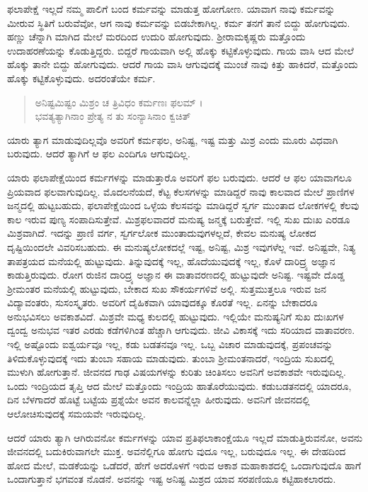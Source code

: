 ಫಲಾಪೇಕ್ಷೆ ಇಲ್ಲದೆ ನಮ್ಮ ಪಾಲಿಗೆ ಬಂದ ಕರ್ಮವನ್ನು ಮಾಡುತ್ತ ಹೋಗೋಣ. ಯಾವಾಗ ನಾವು ಕರ್ಮವನ್ನು ಮೀರುವ ಸ್ಥಿತಿಗೆ ಬರುವೆವೋ, ಆಗ ನಾವು ಕರ್ಮವನ್ನು ಬಿಡಬೇಕಾಗಿಲ್ಲ. ಕರ್ಮ ತನಗೆ ತಾನೆ ಬಿದ್ದು ಹೋಗುವುದು. ಹಣ್ಣು ಚೆನ್ನಾಗಿ ಮಾಗಿದ ಮೇಲೆ ಮರದಿಂದ ಉದುರಿ ಹೋಗುವುದು. ಶ್ರೀರಾಮಕೃಷ್ಣರು ಮತ್ತೊಂದು ಉದಾಹರಣೆಯನ್ನು ಕೊಡುತ್ತಿದ್ದರು. ಬಿದ್ದರೆ ಗಾಯವಾಗಿ ಅಲ್ಲಿ ಹೊಕ್ಕು ಕಟ್ಟಿಕೊಳ್ಳುವುದು. ಗಾಯ ವಾಸಿ ಆದ ಮೇಲೆ ಹೊಕ್ಕು ತಾನೇ ಬಿದ್ದು ಹೋಗುವುದು. ಆದರೆ ಗಾಯ ವಾಸಿ ಆಗುವುದಕ್ಕೆ ಮುಂಚೆ ನಾವು ಕಿತ್ತು ಹಾಕಿದರೆ, ಮತ್ತೊಂದು ಹೊಕ್ಕು ಕಟ್ಟಿಕೊಳ್ಳುವುದು. ಅದರಂತೆಯೇ ಕರ್ಮ.

\begin{verse}
ಅನಿಷ್ಟಮಿಷ್ಟಂ ಮಿಶ್ರಂ ಚ ತ್ರಿವಿಧಂ ಕರ್ಮಣಃ ಫಲಮ್ ।\\ಭವತ್ಯತ್ಯಾಗಿನಾಂ ಪ್ರೇತ್ಯ ನ ತು ಸಂನ್ಯಾಸಿನಾಂ ಕ್ವಚಿತ್ 
\end{verse}

{\small ಯಾರು ತ್ಯಾಗ ಮಾಡುವುದಿಲ್ಲವೊ ಅವರಿಗೆ ಕರ್ಮಫಲ, ಅನಿಷ್ಟ, ಇಷ್ಟ ಮತ್ತು ಮಿಶ್ರ ಎಂದು ಮೂರು ವಿಧವಾಗಿ ಬರುವುದು. ಆದರೆ ತ್ಯಾಗಿಗೆ ಆ ಫಲ ಎಂದಿಗೂ ಆಗುವುದಿಲ್ಲ.}

ಯಾರು ಫಲಾಪೇಕ್ಷೆಯಿಂದ ಕರ್ಮಗಳನ್ನು ಮಾಡುತ್ತಾರೊ ಅವರಿಗೆ ಫಲ ಬರುವುದು. ಆದರೆ ಆ ಫಲ ಯಾವಾಗಲೂ ಪ್ರಿಯವಾದ ಫಲವಾಗುವುದಿಲ್ಲ. ಮೊದಲನೆಯದೆ, ಕೆಟ್ಟ ಕೆಲಸಗಳನ್ನು ಮಾಡಿದ್ದರೆ ನಾವು ಕಾಲವಾದ ಮೇಲೆ ಪ್ರಾಣಿಗಳ ಜನ್ಮದಲ್ಲಿ ಹುಟ್ಟಬಹುದು, ಫಲಾಪೇಕ್ಷೆಯಿಂದ ಒಳ್ಳೆಯ ಕೆಲಸವನ್ನು ಮಾಡಿದ್ದರೆ ಸ್ವರ್ಗ ಮುಂತಾದ ಲೋಕಗಳಲ್ಲಿ ಕೆಲವು ಕಾಲ ಇರುವ ಪುಣ್ಯ ಸಂಪಾದಿಸುತ್ತೇವೆ. ಮಿಶ್ರಫಲವಾದರೆ ಮನುಷ್ಯ ಜನ್ಮಕ್ಕೆ ಬರುತ್ತೇವೆ. ಇಲ್ಲಿ ಸುಖ ದುಃಖ ಎರಡೂ ಮಿಶ್ರವಾಗಿದೆ. ಇದನ್ನು ಪ್ರಾಣಿ ವರ್ಗ, ಸ್ವರ್ಗಲೋಕ ಮುಂತಾದುವುಗಳಲ್ಲದೆ, ಕೇವಲ ಮನುಷ್ಯ ಲೋಕದ ದೃಷ್ಟಿಯಿಂದಲೇ ವಿವರಿಸಬಹುದು. ಈ ಮನುಷ್ಯಲೋಕದಲ್ಲೆ ಇಷ್ಟ, ಅನಿಷ್ಟ, ಮಿಶ್ರ ಇವುಗಳೆಲ್ಲ ಇವೆ. ಅನಿಷ್ಟವೇ, ನಿತ್ಯ ತಾಪತ್ರಯದ ಮನೆಯಲ್ಲಿ ಹುಟ್ಟುವುದು. ತಿನ್ನುವುದಕ್ಕೆ ಇಲ್ಲ, ಹೊದೆಯುವುದಕ್ಕೆ ಇಲ್ಲ, ಕೊಳೆ ದಾರಿದ್ರ್ಯ ಅಜ್ಞಾನ ಕಾಡುತ್ತಿರುವುದು. ರೋಗ ರುಜಿನ ದಾರಿದ್ರ್ಯ ಅಜ್ಞಾನ ಈ ವಾತಾವರಣದಲ್ಲಿ ಹುಟ್ಟುವುದೇ ಅನಿಷ್ಟ. ಇಷ್ಟವೇ ದೊಡ್ಡ ಶ್ರೀಮಂತರ ಮನೆಯಲ್ಲಿ ಹುಟ್ಟುವುದು, ಬೇಕಾದ ಸುಖ ಸೌಕರ್ಯಗಳಿವೆ ಅಲ್ಲಿ. ಸುತ್ತಮುತ್ತಲೂ ಇರುವ ಜನ ವಿದ್ಯಾವಂತರು, ಸುಸಂಸ್ಕೃತರು. ಅವರಿಗೆ ದೈಹಿಕವಾಗಿ ಯಾವುದಕ್ಕೂ ಕೊರತೆ ಇಲ್ಲ. ಏನನ್ನು ಬೇಕಾದರೂ ಅನುಭವಿಸಲು ಅವಕಾಶವಿದೆ. ಮಿಶ್ರವೇ ಮಧ್ಯ ಕುಲದಲ್ಲಿ ಹುಟ್ಟುವುದು. ಇಲ್ಲಿಯೇ ಮನುಷ್ಯನಿಗೆ ಸುಖ ದುಃಖಗಳ ದ್ವಂದ್ವ ಅನುಭವ ಇತರ ಎರಡು ಕಡೆಗಳಿಗಿಂತ ಹೆಚ್ಚಾಗಿ ಆಗುವುದು. ಜೀವಿ ವಿಕಾಸಕ್ಕೆ ಇದು ಸರಿಯಾದ ವಾತಾವರಣ. ಇಲ್ಲಿ ಅಷ್ಟೊಂದು ಐಶ್ವರ್ಯವೂ ಇಲ್ಲ, ಕಡು ಬಡತನವೂ ಇಲ್ಲ. ಒಬ್ಬ ವಿಚಾರ ಮಾಡುವುದಕ್ಕೆ, ಪ್ರಪಂಚವನ್ನು ತಿಳಿದುಕೊಳ್ಳುವುದಕ್ಕೆ ಇದು ತುಂಬಾ ಸಹಾಯ ಮಾಡುವುದು. ತುಂಬಾ ಶ್ರೀಮಂತನಾದರೆ, ಇಂದ್ರಿಯ ಸುಖದಲ್ಲಿ ಮುಳುಗಿ ಹೋಗುತ್ತಾನೆ. ಜೀವನದ ಗಾಢ ವಿಷಯಗಳನ್ನು ಕುರಿತು ಚಿಂತಿಸಲು ಅವನಿಗೆ ಅವಕಾಶವೇ ಇರುವುದಿಲ್ಲ. ಒಂದು ಇಂದ್ರಿಯದ ತೃಪ್ತಿ ಆದ ಮೇಲೆ ಮತ್ತೊಂದು ಇಂದ್ರಿಯ ಹಾತೊರೆಯುವುದು. ಕಡುಬಡತನದಲ್ಲಿ ಯಾದರೂ, ದಿನ ಬೆಳಗಾದರೆ ಹೊಟ್ಟೆ ಬಟ್ಟೆಯ ಪ್ರಶ್ನೆಯೇ ಅವನ ಕಾಲವನ್ನೆಲ್ಲಾ ಹೀರುವುದು. ಅವನಿಗೆ ಜೀವನದಲ್ಲಿ ಆಲೋಚಿಸುವುದಕ್ಕೆ ಸಮಯವೇ ಇರುವುದಿಲ್ಲ.

ಆದರೆ ಯಾರು ತ್ಯಾಗಿ ಆಗಿರುವನೋ ಕರ್ಮಗಳನ್ನು ಯಾವ ಪ್ರತಿಫಲಾಕಾಂಕ್ಷೆಯೂ ಇಲ್ಲದೆ ಮಾಡುತ್ತಿರುವನೋ, ಅವನು ಜೀವನದಲ್ಲಿ ಬದುಕಿರುವಾಗಲೇ ಮುಕ್ತ. ಅವನೆಲ್ಲಿಗೂ ಹೋಗು ವುದೂ ಇಲ್ಲ, ಬರುವುದೂ ಇಲ್ಲ. ಈ ದೇಹದಿಂದ ಹೋದ ಮೇಲೆ, ಮಡಕೆಯನ್ನು ಒಡೆದರೆ, ಹೇಗೆ ಅದರೊಳಗೆ ಇರುವ ಆಕಾಶ ಮಹಾಕಾಶದಲ್ಲಿ ಒಂದಾಗುವುದೊ ಹಾಗೆ ಒಂದಾಗುತ್ತಾನೆ ಭಗವಂತ ನೊಡನೆ. ಅವನನ್ನು ಇಷ್ಟ ಅನಿಷ್ಟ ಮಿಶ್ರದ ಯಾವ ಸರಪಣಿಯೂ ಕಟ್ಟಿಹಾಕಲಾರದು.

